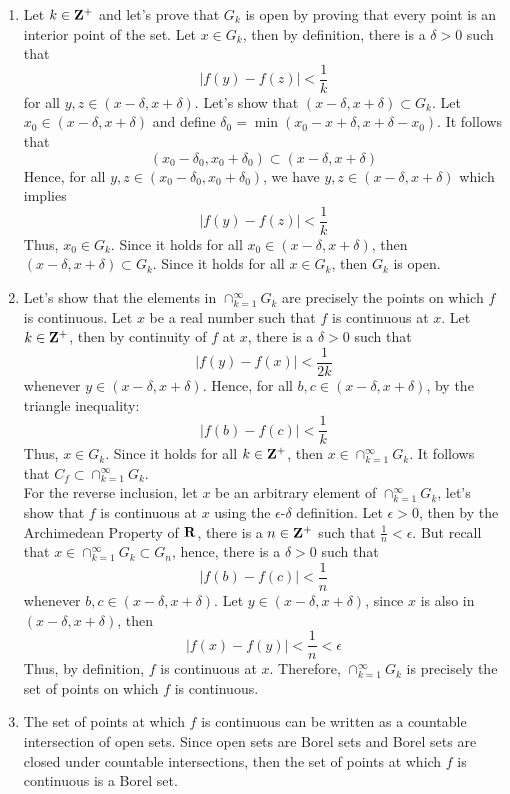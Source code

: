 \begin{solution}
    \begin{enumerate}[label = (\alph*)]
        \item Let $k \in \mathbf{Z}^+$ and let's prove that $G_k$ is open by proving that every point is an interior point of the set. Let $x \in G_k$, then by definition, there is a $\delta > 0$ such that
        $$|f(y) - f(z)| < \frac{1}{k}$$
        for all $y, z \in  (x - \delta, x + \delta)$. Let's show that $(x - \delta, x + \delta) \subset G_k$. Let $x_0 \in (x - \delta, x + \delta)$ and define $\delta_0 = \min(x_0 - x + \delta, x+\delta - x_0)$. It follows that 
        $$(x_0 - \delta_0, x_0 + \delta_0) \subset (x - \delta, x + \delta)$$
        Hence, for all $y, z \in (x_0 - \delta_0, x_0 + \delta_0)$, we have $y, z \in  (x - \delta, x + \delta)$ which implies
        $$|f(y) - f(z)| < \frac{1}{k}$$
        Thus, $x_0 \in G_k$. Since it holds for all $x_0 \in (x - \delta, x + \delta)$, then $(x - \delta, x + \delta) \subset G_k$. Since it holds for all $x \in G_k$, then $G_k$ is open.
        \item  Let's show that the elements in $\cap_{k=1}^{\infty}G_k$ are precisely the points on which $f$ is continuous. Let $x$ be a real number such that $f$ is continuous at $x$. Let $k \in \mathbf{Z}^+$, then by continuity of $f$ at $x$, there is a $\delta > 0$ such that
        $$|f(y) - f(x)| < \frac{1}{2k}$$
        whenever $y \in (x - \delta, x + \delta)$. Hence, for all $b,c \in (x - \delta, x + \delta)$, by the triangle inequality:
        $$|f(b) - f(c)| < \frac{1}{k}$$
        Thus, $x \in G_k$. Since it   holds for all $k \in \mathbf{Z}^+$, then $x \in \cap_{k=1}^{\infty}G_k$. It follows that $C_f \subset \cap_{k=1}^{\infty}G_k$.\\
        For the reverse inclusion, let $x$ be an arbitrary element of $\cap_{k=1}^{\infty}G_k$, let's show that $f$ is continuous at $x$ using the $\epsilon$-$\delta$ definition. Let $\epsilon > 0$, then by the Archimedean Property of $\mathbf{R}$, there is a $n \in \mathbf{Z}^+$ such that $\frac{1}{n} < \epsilon$. But recall that $x \in \cap_{k=1}^{\infty}G_k \subset G_n$, hence, there is a $\delta > 0$ such that 
        $$|f(b) - f(c)| < \frac{1}{n}$$
        whenever $b,c \in (x - \delta, x + \delta)$. Let $y \in (x - \delta, x + \delta)$, since $x$ is also in $(x - \delta, x + \delta)$, then
        $$|f(x) - f(y)| < \frac{1}{n} < \epsilon$$
        Thus, by definition, $f$ is continuous at $x$. Therefore, $\cap_{k=1}^{\infty}G_k$ is precisely the set of points on which $f$ is continuous.
        \item The set of points at which $f$ is continuous can be written as a countable intersection of open sets. Since open sets are Borel sets and Borel sets are closed under countable intersections, then the set of points at which $f$ is continuous is a Borel set. \\
    \end{enumerate}
\end{solution}

